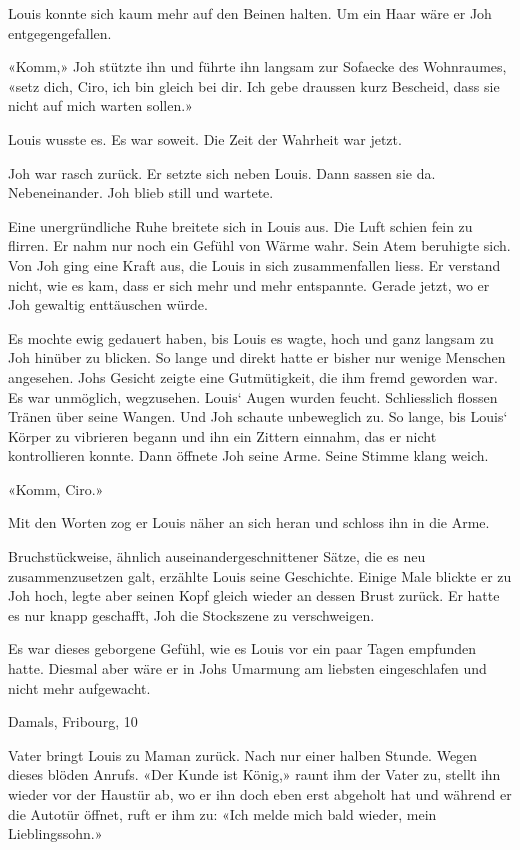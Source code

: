 Louis konnte sich kaum mehr auf den Beinen halten. Um ein Haar wäre er
Joh entgegengefallen.

«Komm,» Joh stützte ihn und führte ihn langsam zur Sofaecke des
Wohnraumes, «setz dich, Ciro, ich bin gleich bei dir. Ich gebe draussen
kurz Bescheid, dass sie nicht auf mich warten sollen.»

Louis wusste es. Es war soweit. Die Zeit der Wahrheit war jetzt.

Joh war rasch zurück. Er setzte sich neben Louis. Dann sassen sie da.
Nebeneinander. Joh blieb still und wartete.

Eine unergründliche Ruhe breitete sich in Louis aus. Die Luft schien
fein zu flirren. Er nahm nur noch ein Gefühl von Wärme wahr. Sein Atem
beruhigte sich. Von Joh ging eine Kraft aus, die Louis in sich
zusammenfallen liess. Er verstand nicht, wie es kam, dass er sich mehr
und mehr entspannte. Gerade jetzt, wo er Joh gewaltig enttäuschen würde.

Es mochte ewig gedauert haben, bis Louis es wagte, hoch und ganz langsam
zu Joh hinüber zu blicken. So lange und direkt hatte er bisher nur
wenige Menschen angesehen. Johs Gesicht zeigte eine Gutmütigkeit, die
ihm fremd geworden war. Es war unmöglich, wegzusehen. Louis` Augen
wurden feucht. Schliesslich flossen Tränen über seine Wangen. Und Joh
schaute unbeweglich zu. So lange, bis Louis` Körper zu vibrieren begann
und ihn ein Zittern einnahm, das er nicht kontrollieren konnte. Dann
öffnete Joh seine Arme. Seine Stimme klang weich.

«Komm, Ciro.»

Mit den Worten zog er Louis näher an sich heran und schloss ihn in die
Arme.

Bruchstückweise, ähnlich auseinandergeschnittener Sätze, die es neu
zusammenzusetzen galt, erzählte Louis seine Geschichte. Einige Male
blickte er zu Joh hoch, legte aber seinen Kopf gleich wieder an dessen
Brust zurück. Er hatte es nur knapp geschafft, Joh die Stockszene zu
verschweigen.

Es war dieses geborgene Gefühl, wie es Louis vor ein paar Tagen
empfunden hatte. Diesmal aber wäre er in Johs Umarmung am liebsten
eingeschlafen und nicht mehr aufgewacht.

Damals, Fribourg, 10

Vater bringt Louis zu Maman zurück. Nach nur einer halben Stunde. Wegen
dieses blöden Anrufs. «Der Kunde ist König,» raunt ihm der Vater zu,
stellt ihn wieder vor der Haustür ab, wo er ihn doch eben erst abgeholt
hat und während er die Autotür öffnet, ruft er ihm zu: «Ich melde mich
bald wieder, mein Lieblingssohn.»

